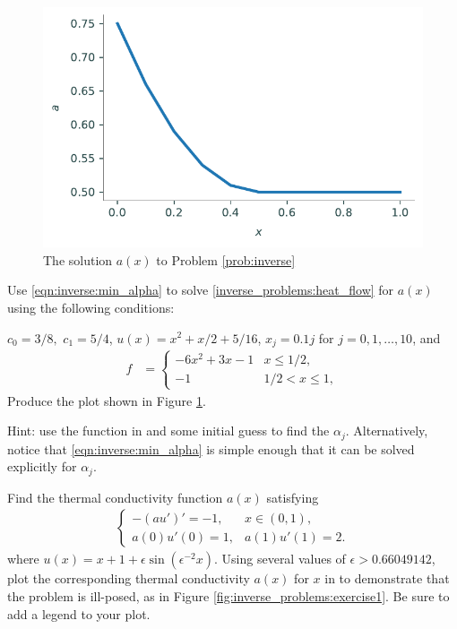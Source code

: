 \begin{figure}[H]
\centering
\includegraphics[width=\textwidth]{figures/density_a.pdf}
\caption{The solution $a(x)$ to Problem \ref{prob:inverse}}
\label{fig:inverse_problems:num1}
\end{figure}

\begin{problem}
Use \eqref{eqn:inverse:min_alpha} to solve \eqref{inverse_problems:heat_flow} for $a(x)$ using the following conditions:

\noindent $c_0 = 3/8,$ $c_1 = 5/4$, $u(x) = x^2 + x/2 + 5/16$, $x_j=0.1j$ for $j=0,1,\dots,10$, and
\begin{align*}
	f &= \begin{cases}
		-6x^2 + 3x - 1 & x \leq 1/2,\\
		-1 & 1/2 < x \leq 1,
	\end{cases}
\end{align*}
Produce the plot shown in Figure \ref{fig:inverse_problems:num1}.

Hint: use the  function in  and some initial guess to find the $\alpha_j$.
 Alternatively, notice that \eqref{eqn:inverse:min_alpha} is simple enough that it can be solved explicitly for $\alpha_j$.
\label{prob:inverse}
\end{problem}

\begin{problem}
	Find the thermal conductivity function $a(x)$ satisfying
	\begin{align}
	\begin{cases}
		-(au')' = -1, & x \in (0,1),\\
		a(0)u'(0) = 1, & a(1)u'(1) = 2.
	\end{cases} \label{inverse_problems:ill_posed}
	\end{align}
	where $u(x) = x + 1 + \epsilon \sin(\epsilon^{-2}x)$.
Using several values of $\epsilon  > 0.66049142$, plot the corresponding thermal conductivity $a(x)$ for $x$ in  to demonstrate that the problem is ill-posed, as in Figure \ref{fig:inverse_problems:exercise1}.
Be sure to add a legend to your plot.
\end{problem}

